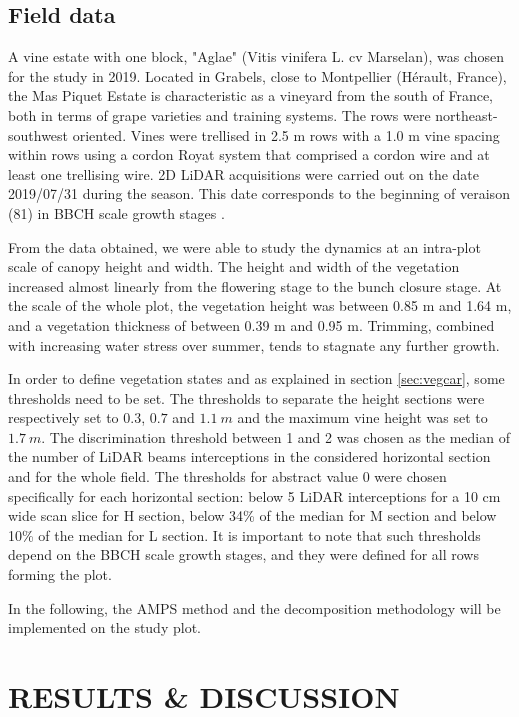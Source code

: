 \documentclass[preprint,3p,times,twocolumn]{elsarticle}
\begin{document}
\subsection{Field data}
A vine estate with one block, "Aglae" (Vitis vinifera L. cv Marselan), was chosen for the study in 2019. Located in Grabels, close to Montpellier (Hérault, France), the Mas Piquet Estate is characteristic as a vineyard from the south of France, both in terms of grape varieties and training systems. The rows were northeast-southwest oriented. Vines were trellised in 2.5 m rows with a 1.0 m vine spacing within rows using a cordon Royat system that comprised a cordon wire and at least one trellising wire. 2D LiDAR acquisitions were carried out on the date 2019/07/31 during the season. This date corresponds to the beginning of veraison (81) in BBCH scale growth stages \cite{lorenz1994phanologische}.

From the data obtained, we were able to study the dynamics at an intra-plot scale of canopy height and width. The height and width of the vegetation increased almost linearly from the flowering stage to the bunch closure stage. At the scale of the whole plot, the vegetation height was between 0.85 m and 1.64 m, and a vegetation thickness of between 0.39 m and 0.95 m. Trimming, combined with increasing water stress over summer, tends to stagnate any further growth.

In order to define vegetation states and as explained in section \ref{sec:vegcar}, some thresholds need to be set. The thresholds to separate the height sections were respectively set to $0.3$, $0.7$ and $1.1\ m $ and the maximum vine height was set to $1.7\ m $. The discrimination threshold between 1 and 2 was chosen as the median of the number of LiDAR beams
interceptions in the considered horizontal section and for the whole field. The thresholds for abstract value 0 were chosen specifically for each horizontal section: below 5 LiDAR interceptions for a 10 cm wide scan slice for H section, below 34\% of the median for M section and below 10\% of the median for L section. It is important to note that such thresholds depend on the BBCH scale growth stages, and they were defined for all rows forming the plot.   


In the following, the AMPS method and the decomposition methodology will be implemented on the study plot.

\section{RESULTS \& DISCUSSION}
\label{results}
\end{document}
